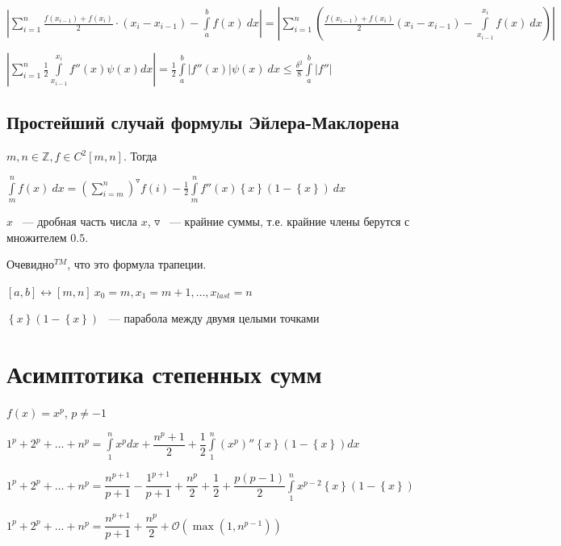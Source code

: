 \documentclass{article}
\begin{document}
			$\left| \sum\limits^n_{i = 1} \frac{f(x_{i - 1}) + f(x_i)}{2} \cdot (x_i - x_{i - 1}) - \int\limits^b_a f(x) \ dx \right| = \left| \sum\limits^n_{i = 1} \left( \frac{f(x_{i - 1}) + f(x_i)}{2}(x_i - x_{i - 1}) - \int\limits^{x_i}_{x_{i - 1}} f(x) \ dx \right) \right|$ 
			
			$\left| \sum\limits^n_{i = 1} \frac{1}{2} \int\limits^{x_i}_{x_{i - 1}} f''(x) \psi(x) dx \right| = \frac{1}{2} \int\limits^b_a \left| f''(x) \right| \psi(x) \ dx \leq \frac{\delta^2}{8} \int\limits^b_a \left| f'' \right|$

		\subsection{Простейший случай формулы Эйлера-Маклорена}

			$m, n \in \mathbb{Z}, f \in C^2[m, n]$. Тогда

			$\int\limits^n_m f(x) \ dx = (\sum\limits^n_{i = m})^{\triangledown} f(i) - \frac{1}{2} \int\limits^n_m f''(x) \left\{ x \right\} (1 - \left\{ x \right\}) \ dx$

			${x}$ ~--- дробная часть числа $x$, $\triangledown$ ~--- крайние суммы, т.е. крайние члены берутся с множителем $0.5$.
			
			Очевидно$^{TM}$, что это формула трапеции.

			$[a, b] \leftrightarrow [m, n] \ x_0 = m, x_1 = m + 1, \ldots, x_{last} = n$

			$\left\{ x \right\} (1 - \left\{ x \right\})$ ~--- парабола между двумя целыми точками
		
    \newpage
    
    \section{Асимптотика степенных сумм}
        
        $f(x) = x^p$, $p \neq -1$
        
        $1^p + 2^p + \ldots + n^p = \int\limits^n_1 x^p dx + \dfrac{n^p + 1}{2} + \dfrac{1}{2} \int\limits^n_1 (x^p)'' \left\{ x \right\} (1 - \left\{ x \right\}) dx$
            
        $1^p + 2^p + \ldots + n^p = \dfrac{n^{p + 1}}{p + 1} - \dfrac{1^{p + 1}}{p + 1} + \dfrac{n^p}{2} + \dfrac{1}{2} + \dfrac{p(p - 1)}{2} \int\limits^n_1 x^{p - 2} \left\{ x \right\} (1 - \left\{ x \right\})$
            
        $1^p + 2^p + \ldots + n^p = \dfrac{n^{p + 1}}{p + 1} + \dfrac{n^p}{2} + \mathcal{O}(\max(1, n^{p - 1}))$
    
\end{document}
